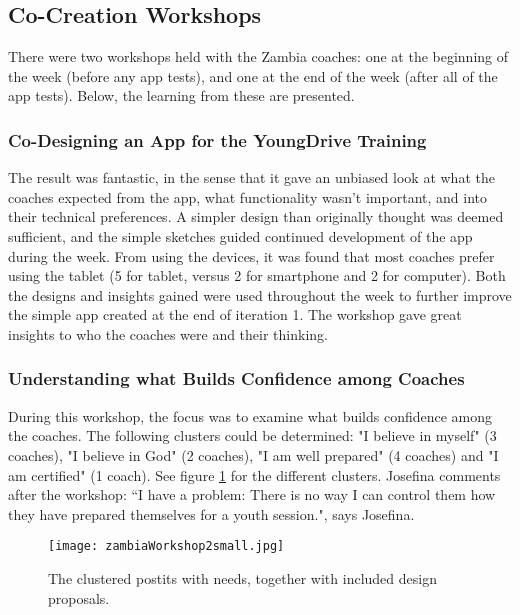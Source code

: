 \subsection{Co-Creation Workshops}

There were two workshops held with the Zambia coaches: one at the beginning of the week (before any app tests), and one at the end of the week (after all of the app tests). Below, the learning from these are presented.

\subsubsection{Co-Designing an App for the YoungDrive Training}

    The result was fantastic, in the sense that it gave an unbiased look at what the coaches expected from the app, what functionality wasn't important, and into their technical preferences. A simpler design than originally thought was deemed sufficient, and the simple sketches guided continued development of the app during the week. From using the devices, it was found that most coaches prefer using the tablet (5 for tablet, versus 2 for smartphone and 2 for computer). Both the designs and insights gained were used throughout the week to further improve the simple app created at the end of iteration 1. The workshop gave great insights to who the coaches were and their thinking.

    \subsubsection{Understanding what Builds Confidence among Coaches}

    During this workshop, the focus was to examine what builds confidence among the coaches. The following clusters could be determined: "I believe in myself" (3 coaches), "I believe in God" (2 coaches), "I am well prepared" (4 coaches) and "I am certified" (1 coach). See figure \ref{fig:zambiaWorkshop2} for the different clusters. Josefina comments after the workshop: “I have a problem: There is no way I can control them how they have prepared themselves for a youth session.", says Josefina.

    \begin{figure}[h]
        \centering
        \texttt{[image: zambiaWorkshop2small.jpg]}
        \caption{The clustered postits with needs, together with included design proposals.}
        \label{fig:zambiaWorkshop2}
    \end{figure}
